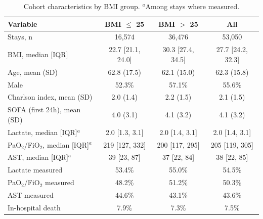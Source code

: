\begin{table}

\caption{\label{tab:cohort}Cohort characteristics by BMI group. $^a$Among stays where measured.}
\centering
\begin{tabular}[t]{lccc}
\toprule
Variable & BMI $\le$ 25 & BMI $>$ 25 & All\\
\midrule
Stays, n & 16,574 & 36,476 & 53,050\\
BMI, median [IQR] & 22.7 [21.1, 24.0] & 30.3 [27.4, 34.5] & 27.7 [24.2, 32.3]\\
Age, mean (SD) & 62.8 (17.5) & 62.1 (15.0) & 62.3 (15.8)\\
Male & 52.3\% & 57.1\% & 55.6\%\\
Charlson index, mean (SD) & 2.0 (1.4) & 2.2 (1.5) & 2.1 (1.5)\\
SOFA (first 24h), mean (SD) & 4.0 (3.1) & 4.1 (3.2) & 4.1 (3.2)\\
Lactate, median [IQR]$^a$ & 2.0 [1.3, 3.1] & 2.0 [1.4, 3.1] & 2.0 [1.4, 3.1]\\
PaO$_2$/FiO$_2$, median [IQR]$^a$ & 219 [127, 332] & 200 [117, 295] & 205 [119, 305]\\
AST, median [IQR]$^a$ & 39 [23, 87] & 37 [22, 84] & 38 [22, 85]\\
Lactate measured & 53.4\% & 55.0\% & 54.5\%\\
PaO$_2$/FiO$_2$ measured & 48.2\% & 51.2\% & 50.3\%\\
AST measured & 44.6\% & 43.1\% & 43.6\%\\
In-hospital death & 7.9\% & 7.3\% & 7.5\%\\
\bottomrule
\end{tabular}
\end{table}
